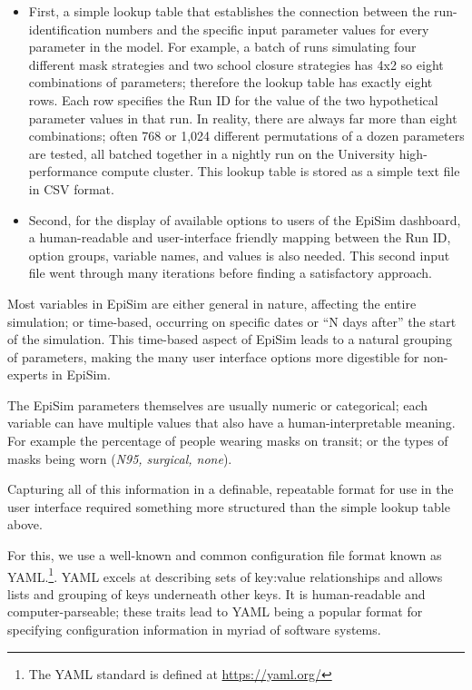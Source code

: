 \begin{itemize}
  \tightlist
  \item
  First, a simple lookup table that establishes the connection between the run-identification numbers and the specific input parameter values for every parameter in the model. For example, a batch of runs simulating four different mask strategies and two school closure strategies has 4x2 so eight combinations of parameters; therefore the lookup table has exactly eight rows. Each row specifies the Run ID for the value of the two hypothetical parameter values in that run. In reality, there are always far more than eight combinations; often 768 or 1,024 different permutations of a dozen parameters are tested, all batched together in a nightly run on the University high-performance compute cluster. This lookup table is stored as a simple text file in CSV format.
  \item
  Second, for the display of available options to users of the EpiSim dashboard, a human-readable and user-interface friendly mapping between the Run ID, option groups, variable names, and values is also needed. This second input file went through many iterations before finding a satisfactory approach.
\end{itemize}

Most variables in EpiSim are either general in nature, affecting the entire simulation; or time-based, occurring on specific dates or ``N days after'' the start of the simulation. This time-based aspect of EpiSim leads to a natural grouping of parameters, making the many user interface options more digestible for non-experts in EpiSim.

The EpiSim parameters themselves are usually numeric or categorical; each variable can have multiple values that also have a human-interpretable meaning. For example the percentage of people wearing masks on transit; or the types of masks being worn (\emph{N95, surgical, none}).

Capturing all of this information in a definable, repeatable format for use in the user interface required something more structured than the simple lookup table above.

For this, we use a well-known and common configuration file format known as \gls{YAML}.\footnote{The YAML standard is defined at \url{https://yaml.org/}}. YAML excels at describing sets of key:value relationships and allows lists and grouping of keys underneath other keys. It is human-readable and computer-parseable; these traits lead to YAML being a popular format for specifying configuration information in myriad of software systems.

